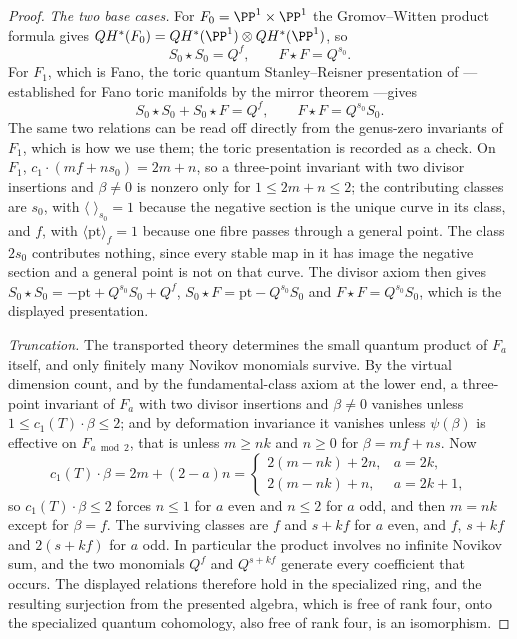 \begin{proof}
\emph{The two base cases.}  For \(F_0=\PP^1\times\PP^1\) the Gromov--Witten
product formula \cite{BehrendProduct} gives
\(QH^*(F_0)=QH^*(\PP^1)\otimes QH^*(\PP^1)\), so
\[
 S_0\star S_0=Q^f,\qquad F\star F=Q^{s_0}.
\]
For \(F_1\), which is Fano, the toric quantum Stanley--Reisner presentation of
\cite[Section~5]{Batyrev}---established for Fano toric manifolds by the mirror
theorem \cite[Theorem~0.1]{Givental}---gives
\[
 S_0\star S_0+S_0\star F=Q^f,\qquad F\star F=Q^{s_0}S_0.
\]
The same two relations can be read off directly from the genus-zero invariants
of \(F_1\), which is how we use them; the toric presentation is recorded as a
check.  On \(F_1\), \(c_1\cdot(mf+ns_0)=2m+n\), so a three-point invariant
with two divisor insertions and \(\beta\ne0\) is nonzero only for
\(1\le 2m+n\le2\); the contributing
classes are \(s_0\), with \(\langle\;\rangle_{s_0}=1\) because the negative
section is the unique curve in its class, and \(f\), with
\(\langle\mathrm{pt}\rangle_f=1\) because one fibre passes through a general
point.  The class \(2s_0\) contributes nothing, since every stable map in it has
image the negative section and a general point is not on that curve.  The divisor
axiom then gives \(S_0\star S_0=-\mathrm{pt}+Q^{s_0}S_0+Q^f\),
\(S_0\star F=\mathrm{pt}-Q^{s_0}S_0\) and \(F\star F=Q^{s_0}S_0\), which is the
displayed presentation.

\emph{Truncation.}  The transported theory determines the small quantum product
of \(F_a\) itself, and only finitely many Novikov monomials survive.  By the
virtual dimension count, and by the fundamental-class axiom at the lower end, a
three-point invariant of \(F_a\) with two divisor insertions and \(\beta\ne0\)
vanishes unless \(1\le c_1(T)\cdot\beta\le2\); and by deformation invariance it
vanishes
unless \(\psi(\beta)\) is effective on \(F_{a\bmod2}\), that is unless
\(m\ge nk\) and \(n\ge0\) for \(\beta=mf+ns\).  Now
\[
 c_1(T)\cdot\beta=2m+(2-a)n=
 \begin{cases}
  2(m-nk)+2n, & a=2k,\\
  2(m-nk)+n, & a=2k+1,
 \end{cases}
\]
so \(c_1(T)\cdot\beta\le2\) forces \(n\le1\) for \(a\) even and \(n\le2\)
for \(a\) odd, and then \(m=nk\) except for \(\beta=f\).  The surviving classes
are \(f\) and \(s+kf\) for \(a\) even, and \(f\), \(s+kf\) and \(2(s+kf)\)
for \(a\) odd.  In particular the product involves no infinite Novikov sum, and
the two monomials \(Q^f\) and \(Q^{s+kf}\) generate every coefficient that
occurs.  The displayed relations therefore hold in the specialized ring, and the
resulting surjection from the presented algebra, which is free of rank four,
onto the specialized quantum cohomology, also free of rank four, is an
isomorphism.


\end{proof}
